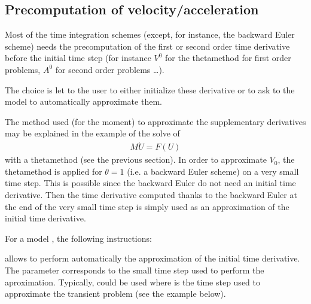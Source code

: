 \documentclass[a4paper,11pt,english]{sphinxmanual}
\begin{document}
\subsection{Precomputation of velocity/acceleration}
\label{\detokenize{userdoc/model_time_integration:precomputation-of-velocity-acceleration}}\label{\detokenize{userdoc/model_time_integration:precomp-time-der-section}}
Most of the time integration schemes (except, for instance, the backward Euler scheme) needs the pre\sphinxhyphen{}computation of the first or second order time derivative before the initial time step (for instance \(V^0\) for the theta\sphinxhyphen{}method for first order problems, \(A^0\) for second order problems …).

The choice is let to the user to either initialize these derivative or to ask to the model to automatically approximate them.

The method used (for the moment) to approximate the supplementary derivatives may be explained in the example of the solve of
\begin{equation*}
\begin{split}M\dot{U} = F(U)\end{split}
\end{equation*}
with a theta\sphinxhyphen{}method (see the previous section). In order to approximate \(V_0\), the theta\sphinxhyphen{}method is applied for \(\theta = 1\) (i.e. a backward Euler scheme) on a very small time step. This is possible since the  backward Euler do not need an initial time derivative. Then the time derivative computed thanks to the  backward Euler at the end of the very small time step is simply used as an approximation of the initial time derivative.

For a model , the following instructions:

\begin{sphinxVerbatim}[commandchars=\\\{\}]
 
\end{sphinxVerbatim}

allows to perform automatically the approximation of the initial time derivative. The parameter  corresponds to the small time step used to perform the aproximation. Typically,  could be used where   is the time step used to approximate the transient problem (see the example below).
\end{document}
